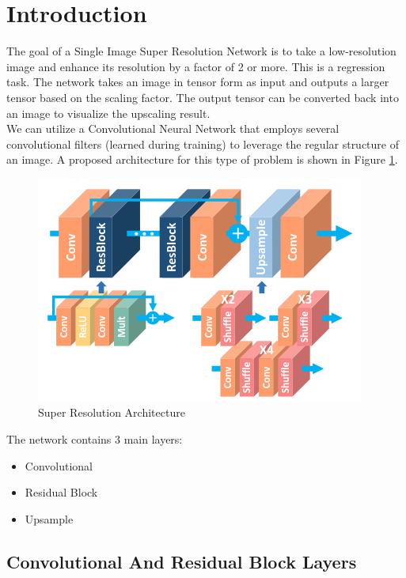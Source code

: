 \documentclass[../report.tex]{subfiles}
\begin{document}
	
\section{Introduction}

The goal of a Single Image Super Resolution Network is to take a low-resolution image and enhance its resolution by a factor of 2 or more. This is a regression task. The network takes an image in tensor form as input and outputs a larger tensor based on the scaling factor. The output tensor can be converted back into an image to visualize the upscaling result.\\
We can utilize a Convolutional Neural Network that employs several convolutional filters (learned during training) to leverage the regular structure of an image. A proposed architecture for this type of problem is shown in Figure \ref{fig:SR_architecture}.
\begin{figure}[tb]
	\caption{Super Resolution Architecture}
	\centering
	\label{fig:SR_architecture}
	\includegraphics[scale=0.6]{../images/SISRN_Architecture.png}
\end{figure}
The network contains 3 main layers:
\begin{itemize}
	\item Convolutional
	\item Residual Block
	\item Upsample
\end{itemize}

\subsection{Convolutional And Residual Block Layers}
\end{document}

